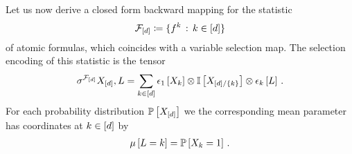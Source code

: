%








Let us now derive a closed form backward mapping for the statistic
\begin{align*}
    \mathcal{F}_{[d]} \coloneqq \{f^{k} \,:\, k\in[d]\}
\end{align*}
of atomic formulas, which coincides with a variable selection map.
The selection encoding of this statistic is the tensor
\begin{align*}
    \sigma^{\mathcal{F}_{[d]}}{X_{[d]},L}
    = \sum_{k\in[d]} \epsilon_{1}\left[X_{k}\right] \otimes \mathbb{I}\left[X_{[d]/\{k\}}\right] \otimes \epsilon_{k}\left[L\right] \, .
\end{align*}
For each probability distribution $\mathbb{P}\left[X_{[d]}\right]$ we the corresponding mean parameter has coordinates at $k\in[d]$ by
\begin{align*}
    \mu\left[L=k\right] = \mathbb{P}\left[X_{k}=1\right]  \, .
\end{align*}

